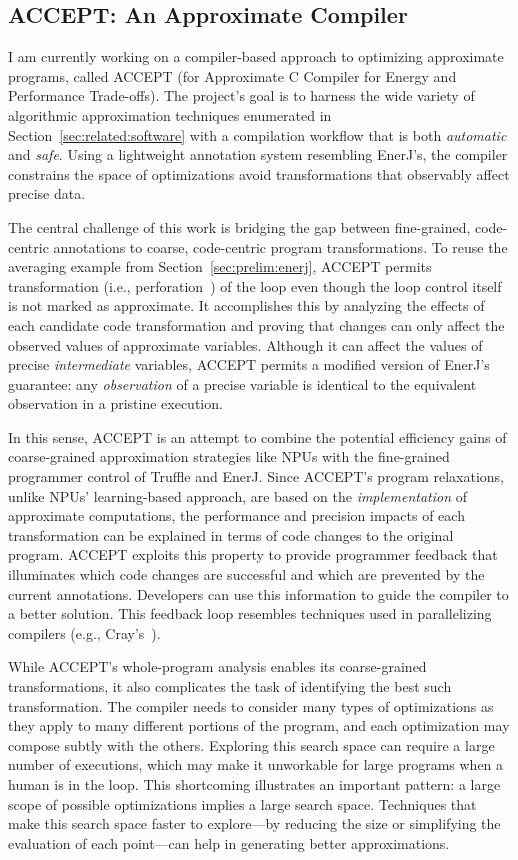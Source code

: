 \subsection{ACCEPT: An Approximate Compiler}
\label{sec:prelim:accept}

I am currently working on a compiler-based approach to optimizing approximate
programs, called ACCEPT (for Approximate C Compiler for Energy and Performance
Trade-offs). The project's goal is to harness the wide variety of
algorithmic approximation techniques enumerated in
Section~\ref{sec:related:software} with a compilation workflow that is both
\emph{automatic} and \emph{safe}. Using a lightweight annotation system
resembling EnerJ's, the compiler constrains the space of optimizations avoid
transformations that observably affect precise data.

The central challenge of this work is bridging the gap between fine-grained,
code-centric annotations to coarse, code-centric program transformations. To
reuse the averaging example from Section~\ref{sec:prelim:enerj}, ACCEPT
permits transformation (i.e., perforation~\cite{perforation}) of the
 loop even though the loop control itself is not marked as
approximate. It accomplishes this by analyzing the effects of each candidate
code transformation and proving that changes can only affect the
observed values of approximate variables. Although it can affect the values of
precise \emph{intermediate} variables, ACCEPT permits a modified version of
EnerJ's guarantee: any \emph{observation} of a precise variable is identical
to the equivalent observation in a pristine execution.

In this sense, ACCEPT is an attempt to combine the potential efficiency gains
of coarse-grained approximation strategies like NPUs with the fine-grained
programmer control of Truffle and EnerJ. Since ACCEPT's program relaxations,
unlike NPUs' learning-based approach, are based on the \emph{implementation}
of approximate computations, the performance and precision impacts of each
transformation can be explained in terms of code changes to the original
program. ACCEPT exploits this property to provide programmer feedback that
illuminates which code changes are successful and which are prevented by the
current annotations. Developers can use this information to guide the compiler
to a better solution. This feedback loop resembles techniques used in
parallelizing compilers (e.g., Cray's~\cite{canal}).

While ACCEPT's whole-program analysis enables its coarse-grained
transformations, it also complicates the task of identifying the best such
transformation. The compiler needs to consider many types of optimizations as
they apply to many different portions of the program, and each optimization
may compose subtly with the others. Exploring this search space can require
a large number of executions, which may make it unworkable for large programs
when a human is in the loop. This shortcoming illustrates an important
pattern: a large scope of possible optimizations implies a large search space.
Techniques that make this search space faster to explore---by reducing the
size or simplifying the evaluation of each point---can help in generating
better approximations.


